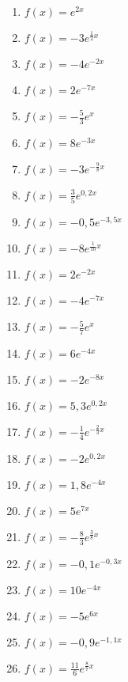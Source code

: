 \begin{Exercise}[title={Bestimme den y-Achsenabschnitt, skizziere das Schaubild, gib die Asymptote, das Verhalten für \(x\rightarrow \pm\infty\) und die Monotonie an}, label=eFktA1]

	\begin{minipage}{\textwidth}
		\begin{minipage}{0.5\textwidth}
			\begin{enumerate}[label=\alph*)]
				\item \(f(x)=e^{2x}\)
				\item \(f(x)=-3e^{\frac{1}{2}x}\)
				\item \(f(x)=-4e^{-2x}\)
				\item \(f(x)=2e^{-7x}\)
				\item \(f(x)=-\frac{5}{3}e^{x}\)
				\item \(f(x)=8e^{-3x}\)
				\item \(f(x)=-3e^{-\frac{9}{8}x}\)
				\item \(f(x)=\frac{3}{5}e^{0,2x}\)
				\item \(f(x)=-0,5e^{-3,5x}\)
				\item \(f(x)=-8e^{\frac{1}{10}x}\)
				\item \(f(x)=2e^{-2x}\)
				\item \(f(x)=-4e^{-7x}\)
				\item \(f(x)=-\frac{5}{7}e^{x}\)
			\end{enumerate}
		\end{minipage}%
		\begin{minipage}{0.5\textwidth}
			\begin{enumerate}[label=\alph*)]
				\setcounter{enumi}{13}
				\item \(f(x)=6e^{-4x}\)
				\item \(f(x)=-2e^{-8x}\)
				\item \(f(x)=5,3e^{0,2x}\)
				\item \(f(x)=-\frac{1}{4}e^{-\frac{2}{3}x}\)
				\item \(f(x)=-2e^{0,2x}\)
				\item \(f(x)=1,8e^{-4x}\)
				\item \(f(x)=5e^{7x}\)
				\item \(f(x)=-\frac{8}{3}e^{\frac{3}{8}x}\)
				\item \(f(x)=-0,1e^{-0,3x}\)
				\item \(f(x)=10e^{-4x}\)
				\item \(f(x)=-5e^{6x}\)
				\item \(f(x)=-0,9e^{-1,1x}\)
				\item \(f(x)=\frac{11}{6}e^{\frac{8}{7}x}\)
			\end{enumerate}
		\end{minipage}%
	\end{minipage}
\end{Exercise}
